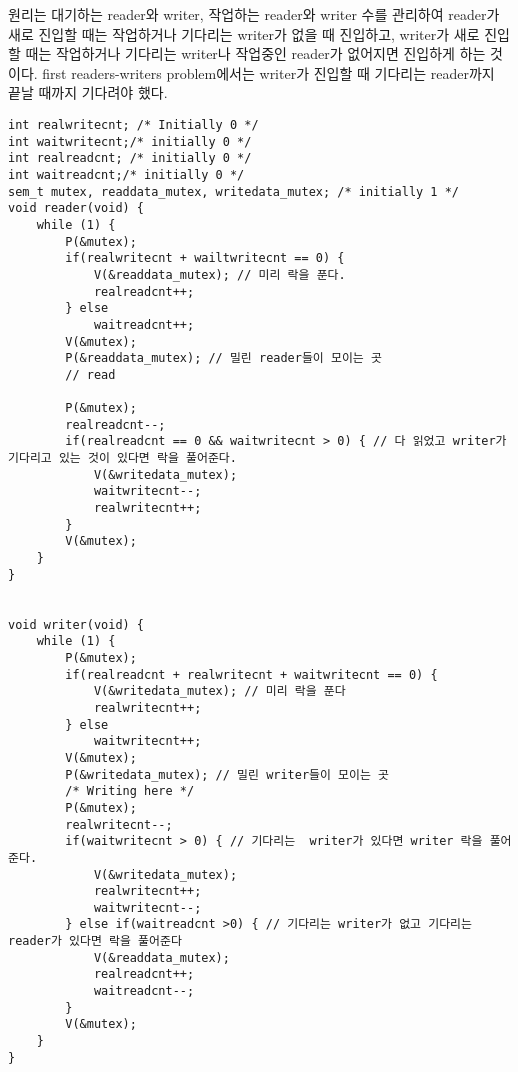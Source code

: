 \documentclass{article}
\begin{document}
원리는 대기하는 reader와 writer, 작업하는 reader와 writer 수를 관리하여 reader가 새로 진입할 때는 작업하거나 기다리는 writer가 없을 때 진입하고, writer가 새로 진입할 때는 작업하거나 기다리는 writer나 작업중인 reader가 없어지면 진입하게 하는 것이다. first readers-writers problem에서는 writer가 진입할 때 기다리는 reader까지 끝날 때까지 기다려야 했다.

\begin{verbatim}
int realwritecnt; /* Initially 0 */
int waitwritecnt;/* initially 0 */
int realreadcnt; /* initially 0 */
int waitreadcnt;/* initially 0 */
sem_t mutex, readdata_mutex, writedata_mutex; /* initially 1 */ 
void reader(void) { 
    while (1) {
        P(&mutex);
        if(realwritecnt + wailtwritecnt == 0) {
            V(&readdata_mutex); // 미리 락을 푼다.
            realreadcnt++;
        } else
            waitreadcnt++;
        V(&mutex);
        P(&readdata_mutex); // 밀린 reader들이 모이는 곳
        // read

        P(&mutex);
        realreadcnt--;
        if(realreadcnt == 0 && waitwritecnt > 0) { // 다 읽었고 writer가 기다리고 있는 것이 있다면 락을 풀어준다.
            V(&writedata_mutex);
            waitwritecnt--;
            realwritecnt++;
        }
        V(&mutex);
    } 
}


void writer(void) { 
    while (1) { 
        P(&mutex);
        if(realreadcnt + realwritecnt + waitwritecnt == 0) {
            V(&writedata_mutex); // 미리 락을 푼다
            realwritecnt++;
        } else
            waitwritecnt++;
        V(&mutex);
        P(&writedata_mutex); // 밀린 writer들이 모이는 곳
        /* Writing here */ 
        P(&mutex);
        realwritecnt--;
        if(waitwritecnt > 0) { // 기다리는  writer가 있다면 writer 락을 풀어준다.
            V(&writedata_mutex);
            realwritecnt++;
            waitwritecnt--;
        } else if(waitreadcnt >0) { // 기다리는 writer가 없고 기다리는 reader가 있다면 락을 풀어준다
            V(&readdata_mutex);
            realreadcnt++;
            waitreadcnt--;
        }
        V(&mutex);
    } 
}
\end{verbatim}
\end{document}
